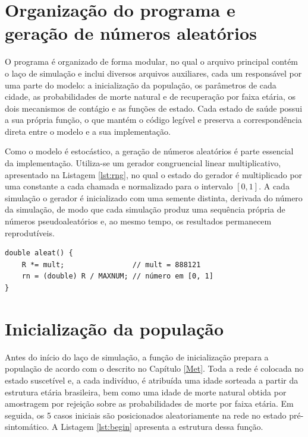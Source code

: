 \section{Organização do programa e geração de números aleatórios}

O programa é organizado de forma modular, no qual o arquivo principal contém o laço de simulação e inclui diversos arquivos auxiliares, cada um responsável por uma parte do modelo: a inicialização da população, os parâmetros de cada cidade, as probabilidades de morte natural e de recuperação por faixa etária, os dois mecanismos de contágio e as funções de estado. Cada estado de saúde possui a sua própria função, o que mantém o código legível e preserva a correspondência direta entre o modelo e a sua implementação.

Como o modelo é estocástico, a geração de números aleatórios é parte essencial da implementação. Utiliza-se um gerador congruencial linear multiplicativo, apresentado na Listagem \ref{lst:rng}, no qual o estado do gerador é multiplicado por uma constante a cada chamada e normalizado para o intervalo $[0,1]$. A cada simulação o gerador é inicializado com uma semente distinta, derivada do número da simulação, de modo que cada simulação produz uma sequência própria de números pseudoaleatórios e, ao mesmo tempo, os resultados permanecem reprodutíveis.

\begin{lstlisting}[caption={Gerador congruencial linear multiplicativo.}, label={lst:rng}]
double aleat() {
    R *= mult;                // mult = 888121
    rn = (double) R / MAXNUM; // número em [0, 1]
}
\end{lstlisting}

\section{Inicialização da população}

Antes do início do laço de simulação, a função de inicialização prepara a população de acordo com o descrito no Capítulo \ref{Met}. Toda a rede é colocada no estado suscetível e, a cada indivíduo, é atribuída uma idade sorteada a partir da estrutura etária brasileira, bem como uma idade de morte natural obtida por amostragem por rejeição sobre as probabilidades de morte por faixa etária. Em seguida, os 5 casos iniciais são posicionados aleatoriamente na rede no estado pré-sintomático. A Listagem \ref{lst:begin} apresenta a estrutura dessa função.

